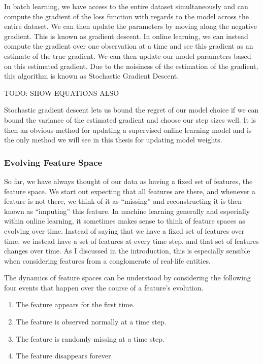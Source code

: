 In batch learning, we have access to the entire dataset simultaneously and can
compute the gradient of the loss function with regards to the model across the
entire dataset. We can then update the parameters by moving along the negative
gradient. This is known as gradient descent. In online learning, we can instead
compute the gradient over one observation at a time and see this gradient as an
estimate of the true gradient. We can then update our model parameters based on
this estimated gradient. Due to the noisiness of the estimation of the
gradient, this algorithm is known as Stochastic Gradient Descent.

TODO: SHOW EQUATIONS ALSO

Stochastic gradient descent lets us bound the regret of our model choice if we
can bound the variance of the estimated gradient and choose our step sizes
well. It is then an obvious method for updating a supervised online learning
model and is the only method we will see in this thesis for updating model
weights.

\subsubsection{Evolving Feature Space}
So far, we have always thought of our data as having a fixed set of features,
the feature space. We start out expecting that all features are there, and
whenever a feature is not there, we think of it as “missing” and reconstructing
it is then known as “imputing” this feature. In machine learning generally and
especially within online learning, it sometimes makes sense to think of feature
spaces as evolving over time. Instead of saying that we have a fixed set of
features over time, we instead have a set of features at every time step, and
that set of features changes over time. As I discussed in the introduction,
this is especially sensible when considering features from a conglomerate of
real-life entities.

The dynamics of feature spaces can be understood by considering the following
four events that happen over the course of a feature's evolution.
\begin{enumerate}
  \item The feature appears for the first time.
  \item The feature is observed normally at a time step.
  \item The feature is randomly missing at a time step.
  \item The feature disappears forever.
\end{enumerate}

